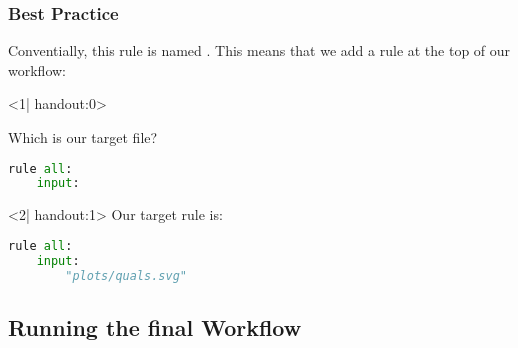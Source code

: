 \begin{frame}[fragile]
  \frametitle{Best Practice}
  Conventially, this rule is named . This means that we add a rule at the top of our workflow:\newline
  \begin{onlyenv}<1| handout:0>
   \begin{question}
   	  Which is our target file?
   \end{question}
   \begin{lstlisting}[language=Python,style=Python]
 rule all:
    input: 
   \end{lstlisting}
  \end{onlyenv}
  \begin{onlyenv}<2| handout:1>
   Our target rule is:
   \begin{lstlisting}[language=Python,style=Python]
 rule all:
    input: 
        "plots/quals.svg"
   \end{lstlisting}
  \end{onlyenv}
\end{frame}

\subsection{Running the final Workflow}


